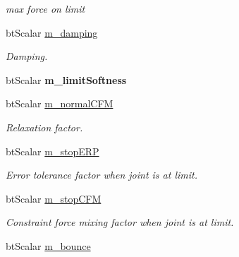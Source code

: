 \begin{DoxyCompactItemize}
\begin{DoxyCompactList}\small\item\em max force on limit \end{DoxyCompactList}\item 
\hypertarget{classbt_rotational_limit_motor_a4aaabbd7dac171217b2ac36c3f2bc240}{bt\+Scalar \hyperlink{classbt_rotational_limit_motor_a4aaabbd7dac171217b2ac36c3f2bc240}{m\+\_\+damping}}\label{classbt_rotational_limit_motor_a4aaabbd7dac171217b2ac36c3f2bc240}

\begin{DoxyCompactList}\small\item\em Damping. \end{DoxyCompactList}\item 
\hypertarget{classbt_rotational_limit_motor_a7f3a07a418826d16a0917a57af079867}{bt\+Scalar {\bfseries m\+\_\+limit\+Softness}}\label{classbt_rotational_limit_motor_a7f3a07a418826d16a0917a57af079867}

\item 
bt\+Scalar \hyperlink{classbt_rotational_limit_motor_a3d06f5a5de013fd97f39cf63273dce45}{m\+\_\+normal\+C\+F\+M}
\begin{DoxyCompactList}\small\item\em Relaxation factor. \end{DoxyCompactList}\item 
\hypertarget{classbt_rotational_limit_motor_a88139c248dfa9b9ab4a8a2431e86aa45}{bt\+Scalar \hyperlink{classbt_rotational_limit_motor_a88139c248dfa9b9ab4a8a2431e86aa45}{m\+\_\+stop\+E\+R\+P}}\label{classbt_rotational_limit_motor_a88139c248dfa9b9ab4a8a2431e86aa45}

\begin{DoxyCompactList}\small\item\em Error tolerance factor when joint is at limit. \end{DoxyCompactList}\item 
\hypertarget{classbt_rotational_limit_motor_ae2f949d3de4c3b059cd914e11fd5ebcd}{bt\+Scalar \hyperlink{classbt_rotational_limit_motor_ae2f949d3de4c3b059cd914e11fd5ebcd}{m\+\_\+stop\+C\+F\+M}}\label{classbt_rotational_limit_motor_ae2f949d3de4c3b059cd914e11fd5ebcd}

\begin{DoxyCompactList}\small\item\em Constraint force mixing factor when joint is at limit. \end{DoxyCompactList}\item 
\hypertarget{classbt_rotational_limit_motor_a4cfd3d5d8d3ba75f1ce4b59f01017364}{bt\+Scalar \hyperlink{classbt_rotational_limit_motor_a4cfd3d5d8d3ba75f1ce4b59f01017364}{m\+\_\+bounce}}\label{classbt_rotational_limit_motor_a4cfd3d5d8d3ba75f1ce4b59f01017364}


\end{DoxyCompactItemize}
